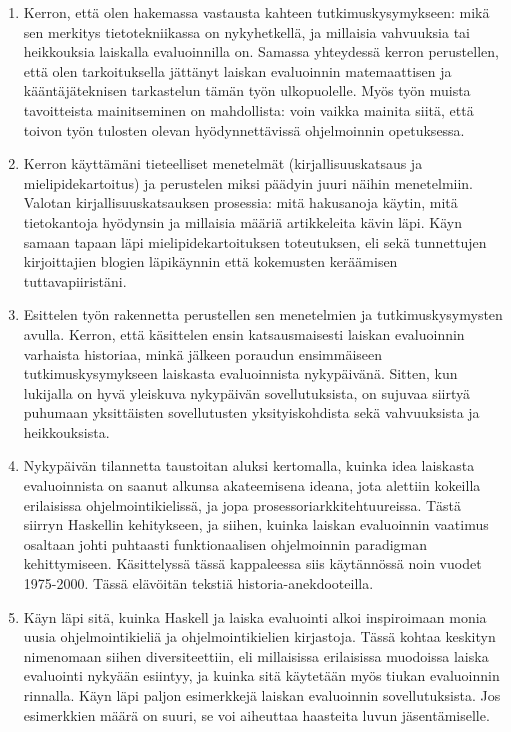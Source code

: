 \documentclass[12pt,a4paper,finnish,oneside]{article}
\begin{document}
\begin{enumerate}
  \item Kerron, että olen hakemassa vastausta kahteen tutkimuskysymykseen: mikä sen merkitys tietotekniikassa on nykyhetkellä, ja millaisia vahvuuksia tai heikkouksia laiskalla evaluoinnilla on. Samassa yhteydessä kerron perustellen, että olen tarkoituksella jättänyt laiskan evaluoinnin matemaattisen ja kääntäjäteknisen tarkastelun tämän työn ulkopuolelle. Myös työn muista tavoitteista mainitseminen on mahdollista: voin vaikka mainita siitä, että toivon työn tulosten olevan hyödynnettävissä ohjelmoinnin opetuksessa.

  \item Kerron käyttämäni tieteelliset menetelmät (kirjallisuuskatsaus ja mielipidekartoitus) ja perustelen miksi päädyin juuri näihin menetelmiin. Valotan kirjallisuuskatsauksen prosessia: mitä hakusanoja käytin, mitä tietokantoja hyödynsin ja millaisia määriä artikkeleita kävin läpi. Käyn samaan tapaan läpi mielipidekartoituksen toteutuksen, eli sekä tunnettujen kirjoittajien blogien läpikäynnin että kokemusten keräämisen tuttavapiiristäni.

  \item Esittelen työn rakennetta perustellen sen menetelmien ja tutkimuskysymysten avulla. Kerron, että käsittelen ensin katsausmaisesti laiskan evaluoinnin varhaista historiaa, minkä jälkeen poraudun ensimmäiseen tutkimuskysymykseen laiskasta evaluoinnista nykypäivänä. Sitten, kun lukijalla on hyvä yleiskuva nykypäivän sovellutuksista, on sujuvaa siirtyä puhumaan yksittäisten sovellutusten yksityiskohdista sekä vahvuuksista ja heikkouksista.

  \item Nykypäivän tilannetta taustoitan aluksi kertomalla, kuinka idea laiskasta evaluoinnista on saanut alkunsa akateemisena ideana, jota alettiin kokeilla erilaisissa ohjelmointikielissä, ja jopa prosessoriarkkitehtuureissa. Tästä siirryn Haskellin kehitykseen, ja siihen, kuinka laiskan evaluoinnin vaatimus osaltaan johti puhtaasti funktionaalisen ohjelmoinnin paradigman kehittymiseen.  Käsittelyssä tässä kappaleessa siis käytännössä noin vuodet 1975-2000. Tässä elävöitän tekstiä historia-anekdooteilla.

  \item Käyn läpi sitä, kuinka Haskell ja laiska evaluointi alkoi inspiroimaan monia uusia ohjelmointikieliä ja ohjelmointikielien kirjastoja. Tässä kohtaa keskityn nimenomaan siihen diversiteettiin, eli millaisissa erilaisissa muodoissa laiska evaluointi nykyään esiintyy, ja kuinka sitä käytetään myös tiukan evaluoinnin rinnalla. Käyn läpi paljon esimerkkejä laiskan evaluoinnin sovellutuksista. Jos esimerkkien määrä on suuri, se voi aiheuttaa haasteita luvun jäsentämiselle.


\end{enumerate}
\end{document}
